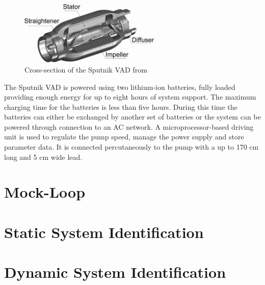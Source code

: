 \begin{figure}[h]
  \centering
  \includegraphics[width=0.6\textwidth]{images/sputnik_cross.png}
  \caption{Cross-section of the Sputnik VAD from \cite{Sputnik6}}
  \label{fig:sput_cross}
\end{figure}
The Sputnik VAD is powered using two lithium-ion batteries, fully loaded providing enough energy for up to eight hours of system support. The maximum charging time for the batteries is less than five hours. During this time the batteries can either be exchanged by another set of batteries or the system can be powered through connection to an AC network. A microprocessor-based driving unit is used to regulate the pump speed, manage the power supply and store parameter data. It is connected percutaneously to the pump with a up to 170 cm long and 5 cm wide lead. \cite{Sputnik1}

\section{Mock-Loop}

\section{Static System Identification}

\section{Dynamic System Identification}
